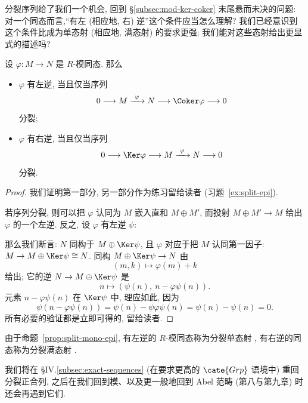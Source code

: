 分裂序列给了我们一个机会, 回到 \S\ref{subsec:mod-ker-coker} 末尾悬而未决的问题: 对一个同态而言,``有左 (相应地, 右) 逆''这个条件应当怎么理解? 我们已经意识到这个条件比成为单态射 (相应地, 满态射) 的要求更强; 我们能对这些态射给出更显式的描述吗?

\begin{proposition}
\label{prop:split-mono-epi}
设 $\varphi : M \to N$ 是 $R$-模同态. 那么
\begin{itemize}
	\item $\varphi$ 有左逆, 当且仅当序列
	\[
	0 \longrightarrow M \xrightarrow{\ \varphi\ } N \longrightarrow \Coker \varphi \longrightarrow 0
	\]
	分裂;
	\item $\varphi$ 有右逆, 当且仅当序列
	\[
	0 \longrightarrow \Ker \varphi \longrightarrow M \xrightarrow{\ \varphi\ } N \longrightarrow 0
	\]
	分裂.
\end{itemize}
\end{proposition}

\begin{proof}
我们证明第一部分, 另一部分作为练习留给读者 (习题~\ref{ex:split-epi}).

若序列分裂, 则可以把 $\varphi$ 认同为 $M$ 嵌入直和 $M \oplus M'$, 而投射 $M \oplus M' \to M$ 给出 $\varphi$ 的一个左逆. 反之, 设 $\varphi$ 有左逆 $\psi$:
\begin{center}
\end{center}
那么我们断言: $N$ 同构于 $M \oplus \Ker \psi$, 且 $\varphi$ 对应于把 $M$ 认同第一因子: $M \to M \oplus \Ker \psi \cong N$. 同构 $M \oplus \Ker \psi \to N$ 由
\[
(m, k) \mapsto \varphi(m) + k
\]
给出; 它的逆 $N \to M \oplus \Ker \psi$ 是
\[
n \mapsto (\psi(n),\ n - \varphi\psi(n)).
\]
元素 $n - \varphi\psi(n)$ 在 $\Ker \psi$ 中, 理应如此, 因为
\[
\psi(n - \varphi\psi(n)) = \psi(n) - \psi\varphi\psi(n) = \psi(n) - \psi(n) = 0.
\]
所有必要的验证都是立即可得的, 留给读者.
\end{proof}

由于命题~\ref{prop:split-mono-epi}, 有左逆的 $R$-模同态称为分裂单态射%
, 有右逆的同态称为分裂满态射%
.

我们将在 \S IV.\ref{subsec:exact-sequences} (在要求更高的 $\cate{Grp}$ 语境中) 重回分裂正合列, 之后在我们回到模、以及更一般地回到 Abel 范畴 (第八与第九章) 时还会再遇到它们.

